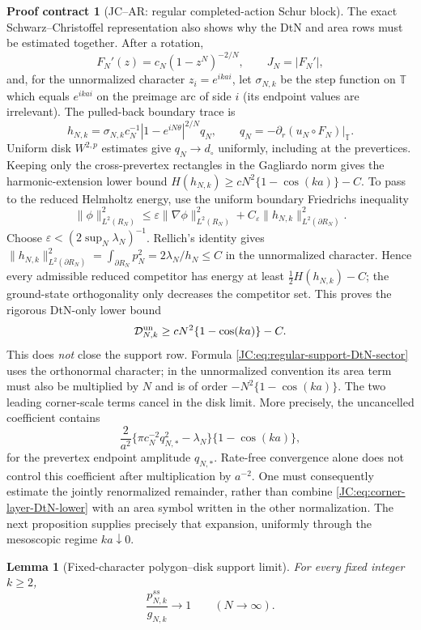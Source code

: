 \documentclass[11pt]{amsart}
\providecommand{\mathscr}{\mathcal}
\numberwithin{equation}{section}
\newtheorem{lemma}[theorem]{Lemma}
\theoremstyle{definition}
\newtheorem{contract}[theorem]{Proof contract}
\theoremstyle{remark}
\providecommand{\mathscr}[1]{\mathcal{#1}}
\begin{document}
\begin{contract}[JC--AR: regular completed-action Schur block]
The exact Schwarz--Christoffel representation also shows why the DtN and
area rows must be estimated together.  After a rotation,
\[
 F_N'(z)=c_N(1-z^N)^{-2/N},\qquad J_N=|F_N'|,
\]
and, for the unnormalized character $z_i=e^{ikai}$, let
$\sigma_{N,k}$ be the step function on $\mathbb T$ which equals
$e^{ikai}$ on the preimage arc of side $i$ (its endpoint values are
irrelevant).  The pulled-back boundary trace is
\[
 h_{N,k}=\sigma_{N,k}c_N^{-1}
 |1-e^{iN\theta}|^{2/N}q_N,
 \qquad q_N=-\partial_r(u_N\circ F_N)|_{\mathbb T}.
\]
Uniform disk $W^{2,p}$ estimates give $q_N\to d_\circ$ uniformly,
including at the prevertices.  Keeping only the cross-prevertex
rectangles in the Gagliardo norm gives the harmonic-extension lower bound
$H(h_{N,k})\ge cN^2\{1-\cos(ka)\}-C$.  To pass to the reduced Helmholtz
energy, use the uniform boundary Friedrichs inequality
\[
 \|\phi\|_{L^2(R_N)}^2
 \le\varepsilon\|\nabla\phi\|_{L^2(R_N)}^2
 +C_\varepsilon\|h_{N,k}\|_{L^2(\partial R_N)}^2.
\]
Choose $\varepsilon<(2\sup_N\lambda_N)^{-1}$.  Rellich's identity gives
$\|h_{N,k}\|_{L^2(\partial R_N)}^2
=\int_{\partial R_N}p_N^2=2\lambda_N/h_N\le C$ in the unnormalized
character.  Hence every admissible reduced competitor has energy at least
$\frac12H(h_{N,k})-C$; the ground-state orthogonality only decreases the
competitor set.  This proves the rigorous DtN-only lower bound
\begin{equation}\label{JC:eq:corner-layer-DtN-lower}
 \mathscr D^{\rm un}_{N,k}
 \ge cN^2\{1-\cos(ka)\}-C.
\end{equation}
This does \emph{not} close the support row.  Formula
\eqref{JC:eq:regular-support-DtN-sector} uses the orthonormal character;
in the unnormalized convention its area term must also be multiplied by
$N$ and is of order
$-N^2\{1-\cos(ka)\}$.  The two leading corner-scale terms cancel in the
disk limit.  More precisely, the uncancelled coefficient contains
\[
 \frac{2}{a^2}
 \{\pi c_N^{-2}q_{N,*}^2-\lambda_N\}
 \{1-\cos(ka)\},
\]
for the prevertex endpoint amplitude $q_{N,*}$.  Rate-free convergence
alone does not control this coefficient after multiplication by $a^{-2}$.
One must consequently estimate the jointly renormalized remainder,
rather than combine
\eqref{JC:eq:corner-layer-DtN-lower} with an area symbol written in the other
normalization.  The next proposition supplies precisely that expansion,
uniformly through the mesoscopic regime $ka\downarrow0$.
\end{contract}

\begin{lemma}[Fixed-character polygon--disk support limit]
\label{JC:lem:fixed-character-support-limit}
For every fixed integer $k\ge2$,
\begin{equation}\label{JC:eq:fixed-character-support-limit}
 \frac{p^{ss}_{N,k}}{g_{N,k}}\longrightarrow1
 \qquad(N\to\infty).
\end{equation}
\end{lemma}
\end{document}
